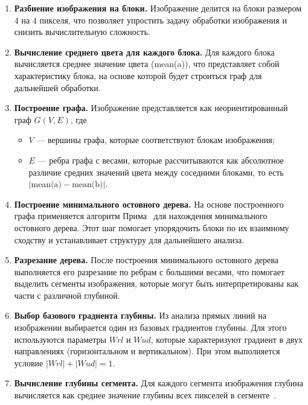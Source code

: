 \begin{enumerate}[label=\arabic*.]
\item \textbf{Разбиение изображения на блоки.}
Изображение делится на блоки размером 4 на 4 пикселя, что позволяет упростить задачу обработки изображения и снизить вычислительную сложность.

\item \textbf{Вычисление среднего цвета для каждого блока.}
Для каждого блока вычисляется среднее значение цвета (mean(a)),
что представляет собой характеристику блока, на основе которой будет строиться граф для дальнейшей обработки.

\item \textbf{Построение графа.}
Изображение представляется как неориентированный граф \(G(V, E)\), где
\begin{itemize}
    \item \(V\) — вершины графа, которые соответствуют блокам изображения;
    \item \(E\) — ребра графа с весами, которые рассчитываются как абсолютное различие средних значений цвета между соседними блоками, то есть \(|\text{mean(a)} - \text{mean(b)}|\).
\end{itemize}

\item \textbf{Построение минимального остовного дерева.}
На основе построенного графа применяется алгоритм Прима~\cite{prima} для нахождения минимального остовного дерева.
Этот шаг помогает упорядочить блоки по их взаимному сходству и устанавливает структуру для дальнейшего анализа.

\item \textbf{Разрезание дерева.}
После построения минимального остовного дерева выполняется его разрезание по ребрам с большими весами, что помогает выделить сегменты изображения, которые могут быть интерпретированы как части с различной глубиной.

\item \textbf{Выбор базового градиента глубины.}
Из анализа прямых линий на изображении выбирается один из базовых градиентов глубины.
Для этого используются параметры \(Wrl\) и \(Wud\), которые характеризуют градиент в двух направлениях (горизонтальном и вертикальном).
При этом выполняется условие \(|Wrl| + |Wud| = 1\).

\item \textbf{Вычисление глубины сегмента.}
Для каждого сегмента изображения глубина вычисляется как среднее значение глубины всех пикселей в сегменте~\cite{comf}.

\end{enumerate}

